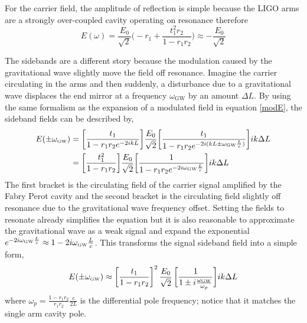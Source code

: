 		For the carrier field, the amplitude of reflection is simple because the LIGO arms are a strongly over-coupled cavity operating on resonance therefore 
		\begin{equation}
			E(\omega) = \frac{E_0}{\sqrt{2}}  \bigg(-r_1 + \frac{t_1^2 r_2}{1-r_1 r_2} \bigg) \approx -\frac{E_0}{\sqrt{2}}
		\end{equation}
		
		The sidebands are a different story because the modulation caused by the gravitational wave slightly move the field off resonance.  Imagine the carrier circulating in the arms and then suddenly, a disturbance due to a gravitational wave displaces the end mirror at a frequency $\omega_\text{GW}$ by an amount $\Delta L$.   By using the same formalism as the expansion of a modulated field in equation \ref{modE}, the sideband fields can be described by,
		\begin{equation}
		\begin{aligned}\label{Egw}
			E(\pm \omega_{\text{\tiny GW}}) &= \bigg[ \frac{t_1}{1-r_1 r_2 e^{-2ikL}}\bigg] \frac{E_0}{\sqrt{2}} \bigg[\frac{t_1}{1-r_1 r_2 e^{-2i (kL \pm \omega_{\text{\tiny GW}}  \frac{L}{c})}} \bigg] ik\Delta L\\
			& =  \bigg[ \frac{t_1^2}{1-r_1 r_2}\bigg]  \frac{E_0}{\sqrt{2}} \bigg[\frac{ 1}{1-r_1 r_2 e^{-2i  \omega_{\text{\tiny GW}}  \frac{L}{c}}} \bigg] ik\Delta L
		\end{aligned}
		\end{equation}
		The first bracket is the circulating field of the carrier signal amplified by the Fabry Perot cavity and the second bracket is the circulating field slightly off resonance due to the gravitational wave frequency offset.  Setting the fields to resonate already simplifies the equation but it is also reasonable to approximate the gravitational wave as a weak signal and expand the exponential $e^{- 2i \omega_{\text{\tiny GW}}  \frac{L}{c}} \approx 1 - 2i \omega_{\text{\tiny GW}}  \frac{L}{c}$.  This transforms the signal sideband field into a simple form,
		\begin{equation}\label{eq:e_gw}
		E(\pm \omega_{\text{\tiny GW}}) \approx \bigg[\frac{t_1}{1-r_1r_2}\bigg]^2 \, \frac{E_0}{\sqrt{2}} \, \bigg[\frac{1}{1 \pm i \frac{\omega_{\text{\tiny GW}}}{\omega_p}}\bigg] ik\Delta L
		\end{equation}
		where $\omega_p = \frac{1-r_1r_2}{r_1r_2}\frac{c}{2L}$ is the differential pole frequency; notice that it matches the single arm cavity pole.
		
